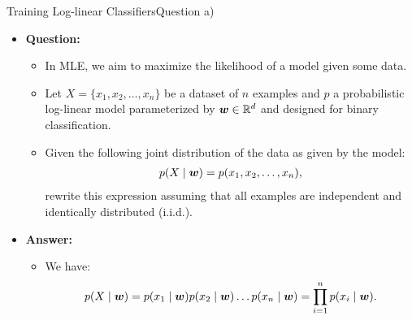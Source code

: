\documentclass[t]{beamer}
\begin{document}
\begin{frame}{Training Log-linear Classifiers}{Question a)}
    \begin{itemize}
        \item \textbf{Question:}
              \begin{itemize}
                  \item In MLE, we aim to maximize the likelihood of a model
                        given some data.
                  \item Let $X=\{x_1, x_2, \ldots, x_n\}$ be a dataset of $n$
                        examples and $p$ a probabilistic log-linear model
                        parameterized by ${\boldsymbol{w}}\in\mathbb{R}^d$ and designed for
                        binary classification.
                  \item Given the following joint distribution of the data as
                        given by the model:
                        \begin{align}
                            p(X\mid{\boldsymbol{w}}) = p(x_1, x_2, \ldots, x_n),
                        \end{align}
                        rewrite this expression assuming that all examples are
                        independent and identically distributed (i.i.d.).
              \end{itemize}
              \pause
        \item \textbf{Answer:}
              \begin{itemize}
                  \item We have:
                        \begin{align}
                            p(X\mid{\boldsymbol{w}}) = p(x_1\mid{\boldsymbol{w}})p(x_2\mid{\boldsymbol{w}})\ldots p(x_n\mid{\boldsymbol{w}}) = \prod_{i=1}^{n}p(x_i\mid{\boldsymbol{w}}).
                        \end{align}
              \end{itemize}
    \end{itemize}
\end{frame}
\end{document}
